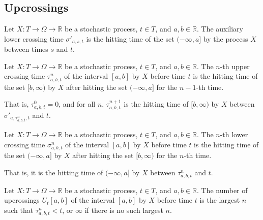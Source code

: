 \subsection{Upcrossings}


\begin{definition}\label{def:lowerCrossingTimeAux}
  \mathlibok
Let $X : T \to \Omega \to \mathbb{R}$ be a stochastic process, $t \in T$, and $a, b \in \mathbb{R}$.
The auxiliary lower crossing time $\sigma'_{a, s, t}$ is the hitting time of the set $(-\infty, a]$ by the process $X$ between times $s$ and $t$.
\end{definition}


\begin{definition}\label{def:upperCrossingTime}
  \mathlibok
Let $X : T \to \Omega \to \mathbb{R}$ be a stochastic process, $t \in T$, and $a, b \in \mathbb{R}$.
The $n$-th upper crossing time $\tau^n_{a, b, t}$ of the interval $[a, b]$ by $X$ before time $t$ is the hitting time of the set $[b, \infty)$ by $X$ after hitting the set $(-\infty, a]$ for the $n-1$-th time.

That is, $\tau^0_{a, b, t} = 0$, and for all $n$, $\tau^{n+1}_{a, b, t}$ is the hitting time of $[b, \infty)$ by $X$ between $\sigma'_{a, \tau^{n}_{a, b, t}, t}$ and $t$.
\end{definition}


\begin{definition}\label{def:lowerCrossingTime}
  \mathlibok
Let $X : T \to \Omega \to \mathbb{R}$ be a stochastic process, $t \in T$, and $a, b \in \mathbb{R}$.
The $n$-th lower crossing time $\sigma^n_{a, b, t}$ of the interval $[a, b]$ by $X$ before time $t$ is the hitting time of the set $(-\infty, a]$ by $X$ after hitting the set $[b, \infty)$ for the $n$-th time.

That is, it is the hitting time of $(-\infty, a]$ by $X$ between $\tau^n_{a, b, t}$ and $t$.
\end{definition}


\begin{definition}\label{def:upcrossingsBefore}
  \mathlibok
Let $X : T \to \Omega \to \mathbb{R}$ be a stochastic process, $t \in T$, and $a, b \in \mathbb{R}$.
The number of upcrossings $U_t[a, b]$ of the interval $[a, b]$ by $X$ before time $t$ is the largest $n$ such that $\tau^n_{a, b, t} < t$, or $\infty$ if there is no such largest $n$.
\end{definition}


